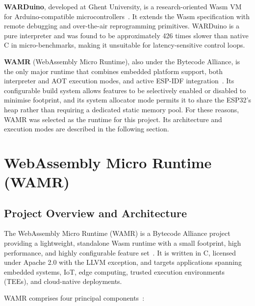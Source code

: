 \documentclass[12pt, a4paper]{report}
\begin{document}
\textbf{WARDuino}, developed at Ghent University, is a research-oriented Wasm VM for
Arduino-compatible microcontrollers~\cite{warduino2024}. It extends the Wasm specification
with remote debugging and over-the-air reprogramming primitives. WARDuino is a pure
interpreter and was found to be approximately 426 times slower than native C in micro-benchmarks,
making it unsuitable for latency-sensitive control loops.

\textbf{WAMR} (WebAssembly Micro Runtime), also under the Bytecode Alliance, is the only
major runtime that combines embedded platform support, both interpreter and AOT execution
modes, and active ESP-IDF integration~\cite{wamr-github}. Its configurable build system
allows features to be selectively enabled or disabled to minimise footprint, and its
system allocator mode permits it to share the ESP32's heap rather than requiring a
dedicated static memory pool. For these reasons, WAMR was selected as the runtime for
this project. Its architecture and execution modes are described in the following section.

\section{WebAssembly Micro Runtime (WAMR)}
\label{sec:wamr}

\subsection{Project Overview and Architecture}
\label{subsec:wamr-overview}

The WebAssembly Micro Runtime (WAMR) is a Bytecode Alliance project providing a
lightweight, standalone Wasm runtime with a small footprint, high performance, and highly
configurable feature set~\cite{wamr-github, wamr-project-doc}. It is written in C, licensed
under Apache 2.0 with the LLVM exception, and targets applications spanning embedded
systems, IoT, edge computing, trusted execution environments (TEEs), and cloud-native
deployments.

WAMR comprises four principal components~\cite{wamr-project-doc}:
\end{document}
